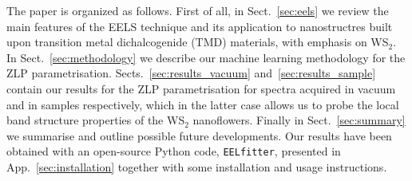 The paper is organized as follows.
%
First of all, in Sect.~\ref{sec:eels}
we review the main features of the EELS technique
and its application to nanostructres built upon transition metal
dichalcogenide (TMD) materials, with emphasis on WS$_2$.
%
In Sect.~\ref{sec:methodology} we describe our machine learning methodology
for the ZLP parametrisation.
%
Sects.~\ref{sec:results_vacuum} and~\ref{sec:results_sample} contain
our results for the ZLP parametrisation for spectra acquired
in vacuum and in samples respectively, which in the latter
case allows us to probe the local band structure properties
of the WS$_2$ nanoflowers.
%
Finally in Sect.~\ref{sec:summary} we summarise
and outline possible future developments.
%
Our results have been obtained with an open-source {\sc Python} code,
{\tt EELfitter}, presented in App.~\ref{sec:installation}
together with some installation and usage instructions.
